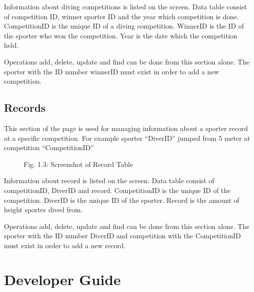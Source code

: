 \documentclass[a4paper,10pt,english]{sphinxmanual}
\begin{document}
Information about diving competitions is listed on the screen.
Data table consist of competition ID, winner sporter ID and the year which competition is done.
CompetitionID is the unique ID of a diving competition.
WinnerID is the ID of the sporter who won the competition.
Year is the date which the competition held.

Operations add, delete, update and find can be done from this section alone.
The sporter with the ID number winnerID must exist in order to add a new competition.


\section{Records}
\label{user/member5:records}
This section of the page is used for managing information about a sporter record at a specific competition.
For example sporter ``DiverID'' jumped from 5 meter at competition ``CompetitionID''
\begin{figure}[htbp]
\centering
\capstart

\caption{Fig. 1.3: Screenshot of Record Table}\end{figure}

Information about record is listed on the screen.
Data table consist of competitionID, DiverID and record.
CompetitionID is the unique ID of the competition.
DiverID is the unique ID of the sporter.
Record is the amount of height sporter dived from.

Operations add, delete, update and find can be done from this section alone.
The sporter with the ID number DiverID and competition with the CompetitionID must exist in order to add a new record.


\chapter{Developer Guide}
\label{developer/index::doc}\label{developer/index:developer-guide}
\end{document}

